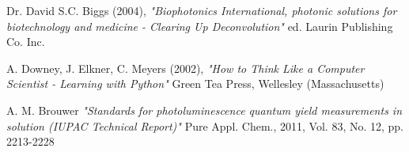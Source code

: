 \begin{thebibliography}{3}
 Dr. David S.C. Biggs (2004), \emph{"Biophotonics International, photonic solutions for biotechnology and medicine - Clearing Up Deconvolution"} \newline ed. Laurin Publishing Co. Inc.

 A. Downey, J. Elkner, C. Meyers (2002), \emph{"How to Think Like a Computer Scientist - Learning with Python"} \newline Green Tea Press, Wellesley (Massachusetts)

 A. M. Brouwer \emph{"Standards for photoluminescence quantum yield measurements in solution (IUPAC Technical Report)"} \newline Pure Appl. Chem., 2011, Vol. 83, No. 12, pp. 2213-2228

\end{thebibliography} 